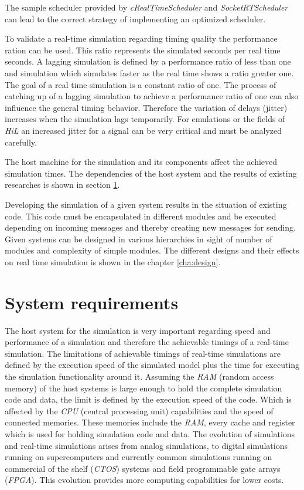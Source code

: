 The sample scheduler provided by \emph{cRealTimeScheduler} and \emph{SocketRTScheduler} can lead to the correct strategy of implementing an optimized scheduler.

To validate a real-time simulation regarding timing quality the performance ration can be used.
This ratio represents the simulated seconds per real time seconds.
A lagging simulation is defined by a performance ratio of less than one and simulation which simulates faster as the real time shows a ratio greater one.
The goal of a real time simulation is a constant ratio of one.
The process of catching up of a lagging simulation to achieve a performance ratio of one can also influence the general timing behavior.
Therefore the variation of delays (jitter) increases when the simulation lags temporarily.
For emulations or the fields of \emph{HiL} an increased jitter for a signal can be very critical and must be analyzed carefully.

The host machine for the simulation and its components affect the achieved simulation times.
The dependencies of the host system and the results of existing researches is shown in section \ref{sec:simulation_requirements}.

Developing the simulation of a given system results in the situation of existing code.
This code must be encapsulated in different modules and be executed depending on incoming messages and thereby creating new messages for sending.
Given systems can be designed in various hierarchies in sight of number of modules and complexity of simple modules.
The different designs and their effects on real time simulation is shown in the chapter \ref{cha:design}.

\section{System requirements}
\label{sec:simulation_requirements}
The host system for the simulation is very important regarding speed and performance of a simulation and therefore the achievable timings of a real-time simulation.
The limitations of achievable timings of real-time simulations are defined by the execution speed of the simulated model plus the time for executing the simulation functionality around it.
Assuming the \emph{RAM} (random access memory) of the host systems is large enough to hold the complete simulation code and data, the limit is defined by the execution speed of the code.
Which is affected by the \emph{CPU} (central processing unit) capabilities and the speed of connected memories.
These memories include the \emph{RAM}, every cache and register which is used for holding simulation code and data.
The evolution of simulations and real-time simulations arises from analog simulations, to digital simulations running on supercomputers and currently common simulations running on commercial of the shelf (\emph{CTOS}) systems and field programmable gate arrays (\emph{FPGA}).
This evolution provides more computing capabilities for lower costs. \cite[section IV]{belanger_what_2010}